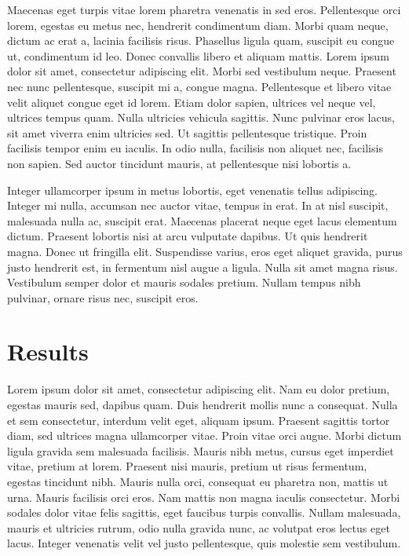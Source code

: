 \documentclass[manuscript]{geophysics}
\begin{document}
Maecenas eget turpis vitae lorem pharetra venenatis in sed eros. Pellentesque
orci lorem, egestas eu metus nec, hendrerit condimentum diam. Morbi quam neque,
dictum ac erat a, lacinia facilisis risus. Phasellus ligula quam, suscipit eu
congue ut, condimentum id leo. Donec convallis libero et aliquam mattis. Lorem
ipsum dolor sit amet, consectetur adipiscing elit. Morbi sed vestibulum neque.
Praesent nec nunc pellentesque, suscipit mi a, congue magna. Pellentesque et
libero vitae velit aliquet congue eget id lorem. Etiam dolor sapien, ultrices
vel neque vel, ultrices tempus quam. Nulla ultricies vehicula sagittis. Nunc
pulvinar eros lacus, sit amet viverra enim ultricies sed. Ut sagittis
pellentesque tristique. Proin facilisis tempor enim eu iaculis. In odio nulla,
facilisis non aliquet nec, facilisis non sapien. Sed auctor tincidunt mauris,
at pellentesque nisi lobortis a.

Integer ullamcorper ipsum in metus lobortis, eget venenatis tellus adipiscing.
Integer mi nulla, accumsan nec auctor vitae, tempus in erat. In at nisl
suscipit, malesuada nulla ac, suscipit erat. Maecenas placerat neque eget lacus
elementum dictum. Praesent lobortis nisi at arcu vulputate dapibus. Ut quis
hendrerit magna. Donec ut fringilla elit. Suspendisse varius, eros eget aliquet
gravida, purus justo hendrerit est, in fermentum nisl augue a ligula. Nulla sit
amet magna risus. Vestibulum semper dolor et mauris sodales pretium. Nullam
tempus nibh pulvinar, ornare risus nec, suscipit eros.

\section{Results}




Lorem ipsum dolor sit amet, consectetur adipiscing elit. Nam eu dolor pretium,
egestas mauris sed, dapibus quam. Duis hendrerit mollis nunc a consequat. Nulla
et sem consectetur, interdum velit eget, aliquam ipsum. Praesent sagittis
tortor diam, sed ultrices magna ullamcorper vitae. Proin vitae orci augue.
Morbi dictum ligula gravida sem malesuada facilisis. Mauris nibh metus, cursus
eget imperdiet vitae, pretium at lorem. Praesent nisi mauris, pretium ut risus
fermentum, egestas tincidunt nibh. Mauris nulla orci, consequat eu pharetra
non, mattis ut urna. Mauris facilisis orci eros. Nam mattis non magna iaculis
consectetur. Morbi sodales dolor vitae felis sagittis, eget faucibus turpis
convallis. Nullam malesuada, mauris et ultricies rutrum, odio nulla gravida
nunc, ac volutpat eros lectus eget lacus. Integer venenatis velit vel justo
pellentesque, quis molestie sem vestibulum.
\end{document}
